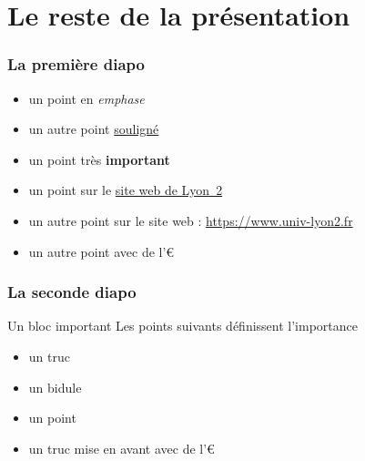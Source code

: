 \documentclass[10pt,t]{beamer}
\begin{document}

\section{Le reste de la présentation}


\begin{frame}
  \frametitle{La première diapo}
  
  
  \begin{itemize}
  \item un point en \emph{emphase}
  \item un autre point \underline{souligné}
  \item un point très \textbf{important}
  \end{itemize} 
  
  \pause  
  
  
  \begin{itemize}
  \item un point sur le \href{https://www.univ-lyon2.fr}{site web de Lyon~2}
  \item un autre point sur le site web : \url{https://www.univ-lyon2.fr}
  \item un autre point avec de l'€
  \end{itemize} 
\end{frame}


\begin{frame}
  \frametitle{La seconde diapo}
  
  
  \begin{block}{Un bloc important}
    Les points suivants définissent l'importance
    \begin{itemize}
    \item un truc
    \item un bidule
    \end{itemize}
  \end{block}
  
  \pause  
  
  
  \begin{itemize}
  \item un point
  \item un truc mise en \alert{avant} avec de l'€
  \end{itemize} 
\end{frame}

\end{document}
